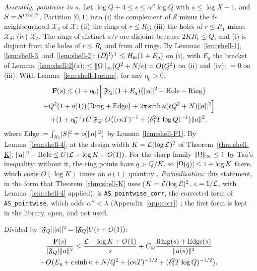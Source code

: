 \emph{Assembly, pointwise in $s$.} Let $\log Q+4\le s\le\alpha''\log Q$ with $s\le\log X-1$, and $S=S^{\rm near,P}$. Partition $[0,1)$ into (i) the complement of $\mathcal S$ minus the
$\delta$-neighbourhood $\mathcal X_\delta$ of $\mathcal X$; (ii) the rings of $r\le R_1$; (iii) the holes of $r\le R_1$ minus $\mathcal X_\delta$; (iv) $\mathcal X_\delta$. The rings of
distinct $a/r$ are disjoint because $2KR_1\le Q$, and (i) is disjoint from the holes of $r\le R_0$ and from all rings. By Lemmas~\ref{lem:shell-1}, \ref{lem:shell-3}
and~\ref{lem:shell-2}: $(D^{\Omega}_\delta)^+\le H_{\mathfrak w}(1+E_g)$ on (i), with $E_g$ the bracket of Lemma~\ref{lem:shell-2}(a); $\le\lVert \Omega\rVert_\infty(Q^2+N/\epsilon)=O(Q^2)$ on (ii) and (iv);
$=0$ on (iii). With Lemma~\ref{lem:shell-1prime}, for any $\eta_0>0$,
\begin{multline}\label{eq:shell-assembly}
\mathbf F(s)\le(1+\eta_0)\Bigl[\lvert \mathfrak F_Q\rvert(1+E_g)\bigl(\lVert a\rVert^2-\mathrm{Hole}-\mathrm{Ring}\bigr)\\
+Q^2(1+o(1))\bigl(\mathrm{Ring}+\mathrm{Edge}\bigr)+2\pi\sinh\kappa(\epsilon Q^2+N)\lVert a\rVert^2\Bigr]\\
+(1+\eta_0^{-1})\,C\lvert \mathfrak F_Q\rvert\,O\bigl((c\kappa T)^{-1}+(\delta_1^2T\log Q)^{-1}\bigr)\lVert a\rVert^2,
\end{multline}
where $\mathrm{Edge}:=\int_{\mathcal X_\delta}\lvert S\rvert^2=o(\lVert a\rVert^2)$ by Lemma~\ref{lem:shell-F1}. By Lemma~\ref{lem:shell-4}, at the design width $K=\mathcal L(\log\mathcal L)^2$ of Theorem~\ref{thm:shell-K},
$\lVert a\rVert^2-\mathrm{Hole}\le U(\mathcal L+\log K+O(1))$. For the sharp family $\lVert \Omega\rVert_\infty\le1$ by Tao's inequality; without it, the ring points have $q>Q/K$, so
$\lvert \Omega(q)\rvert\le1+\log K$ there, which costs $O(\log K)$ times an $o(1)$ quantity \tagM. \emph{Formalisation:} this statement, in the form that Theorem~\ref{thm:shell-K}
uses ($K=\mathcal L(\log\mathcal L)^2$, $\epsilon=1/\mathcal L$, with Lemma~\ref{lem:shell-4} applied), is \texttt{AS\_pointwise\_corr}, the corrected form of
\texttt{AS\_pointwise}, which adds $\alpha''<\lambda$ (Appendix~\ref{app:corr}) \tagL; the first form is kept in the library, open, and not used.

Divided by $\lvert \mathfrak F_Q\rvert\lVert a\rVert^2=\lvert \mathfrak F_Q\rvert U(s+O(1))$:
\begin{multline}\label{eq:shell-pointwise}
\frac{\mathbf F(s)}{\lvert \mathfrak F_Q\rvert\lVert a\rVert^2}\le\frac{\mathcal L+\log K+O(1)}s+C_Q\frac{\mathrm{Ring}(s)+\mathrm{Edge}(s)}{\lVert a(s)\rVert^2}\\
+O\bigl(E_g+\epsilon\sinh\kappa+N/Q^2+(c\kappa T)^{-1/2}+(\delta_1^2T\log Q)^{-1/2}\bigr).
\end{multline}

